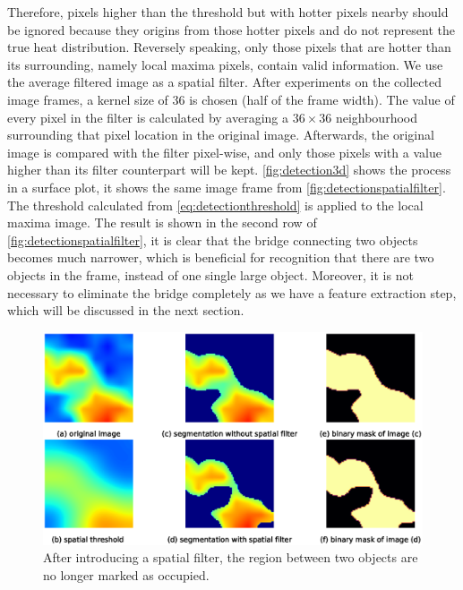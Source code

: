 Therefore, pixels higher than the threshold but with hotter pixels nearby should be ignored because they origins from those hotter pixels and do not represent the true heat distribution. Reversely speaking, only those pixels that are hotter than its surrounding, namely local maxima pixels, contain valid information. We use the average filtered image as a spatial filter. After experiments on the collected image frames, a kernel size of 36 is chosen (half of the frame width). The value of every pixel in the filter is calculated by averaging a $36\times36$ neighbourhood surrounding that pixel location in the original image. Afterwards, the original image is compared with the filter pixel-wise, and only those pixels with a value higher than its filter counterpart will be kept. \autoref{fig:detection3d} shows the process in a surface plot, it shows the same image frame from \autoref{fig:detectionspatialfilter}. The threshold calculated from \autoref{eq:detectionthreshold} is applied to the local maxima image. The result is shown in the second row of \autoref{fig:detectionspatialfilter}, it is clear that the bridge connecting two objects becomes much narrower, which is beneficial for recognition that there are two objects in the frame, instead of one single large object. Moreover, it is not necessary to eliminate the bridge completely as we have a feature extraction step, which will be discussed in the next section.
\begin{figure}
  \centering
  \includegraphics[width=\textwidth]{figures/detect_spatialfilter.eps}
  \caption{After introducing a spatial filter, the region between two objects are no longer marked as occupied.}\label{fig:detectionspatialfilter}
\end{figure}
